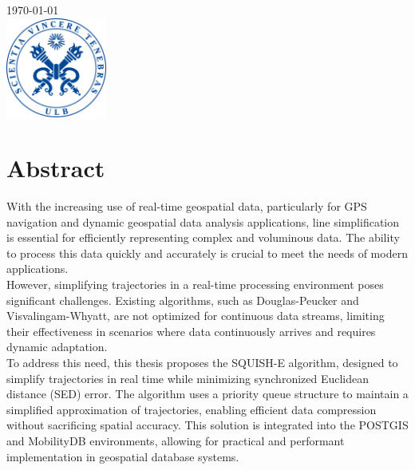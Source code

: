 \documentclass[twoside,12pt, a4paper]{report}
\begin{document}
\begin{titlepage}

{\large \today}\\[1cm] %


\includegraphics[width=3.3cm, height=3.3cm]{sceau-a-quadri.jpg}%
 

\end{titlepage}


\section*{Abstract}

With the increasing use of real-time geospatial data, particularly for GPS navigation and dynamic geospatial data analysis applications, line simplification is essential for efficiently representing complex and voluminous data. The ability to process this data quickly and accurately is crucial to meet the needs of modern applications.\\

However, simplifying trajectories in a real-time processing environment poses significant challenges. Existing algorithms, such as Douglas-Peucker and Visvalingam-Whyatt, are not optimized for continuous data streams, limiting their effectiveness in scenarios where data continuously arrives and requires dynamic adaptation.\\

To address this need, this thesis proposes the SQUISH-E algorithm, designed to simplify trajectories in real time while minimizing synchronized Euclidean distance (SED) error. The algorithm uses a priority queue structure to maintain a simplified approximation of trajectories, enabling efficient data compression without sacrificing spatial accuracy. This solution is integrated into the POSTGIS and MobilityDB environments, allowing for practical and performant implementation in geospatial database systems.\\
\end{document}
